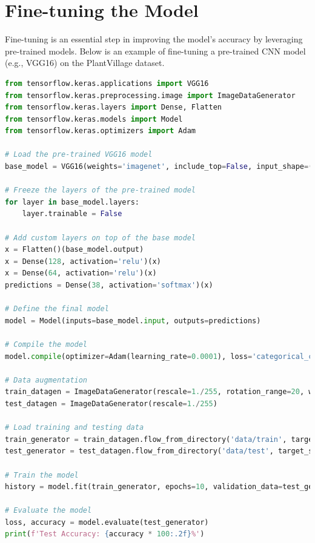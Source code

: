\section{Fine-tuning the Model}
Fine-tuning is an essential step in improving the model's accuracy by
leveraging pre-trained models. Below is an example of fine-tuning a pre-trained
CNN model (e.g., VGG16) on the PlantVillage dataset. \cite{radenović2018finetuningcnnimageretrieval}

\begin{lstlisting}[language=Python, caption=Fine-tuning a Pre-trained CNN]
from tensorflow.keras.applications import VGG16
from tensorflow.keras.preprocessing.image import ImageDataGenerator
from tensorflow.keras.layers import Dense, Flatten
from tensorflow.keras.models import Model
from tensorflow.keras.optimizers import Adam

# Load the pre-trained VGG16 model
base_model = VGG16(weights='imagenet', include_top=False, input_shape=(256, 256, 3))

# Freeze the layers of the pre-trained model
for layer in base_model.layers:
    layer.trainable = False

# Add custom layers on top of the base model
x = Flatten()(base_model.output)
x = Dense(128, activation='relu')(x)
x = Dense(64, activation='relu')(x)
predictions = Dense(38, activation='softmax')(x)

# Define the final model
model = Model(inputs=base_model.input, outputs=predictions)

# Compile the model
model.compile(optimizer=Adam(learning_rate=0.0001), loss='categorical_crossentropy', metrics=['accuracy'])

# Data augmentation
train_datagen = ImageDataGenerator(rescale=1./255, rotation_range=20, width_shift_range=0.2, height_shift_range=0.2, horizontal_flip=True)
test_datagen = ImageDataGenerator(rescale=1./255)

# Load training and testing data
train_generator = train_datagen.flow_from_directory('data/train', target_size=(256, 256), batch_size=32, class_mode='categorical')
test_generator = test_datagen.flow_from_directory('data/test', target_size=(256, 256), batch_size=32, class_mode='categorical')

# Train the model
history = model.fit(train_generator, epochs=10, validation_data=test_generator)

# Evaluate the model
loss, accuracy = model.evaluate(test_generator)
print(f'Test Accuracy: {accuracy * 100:.2f}%')
\end{lstlisting}
